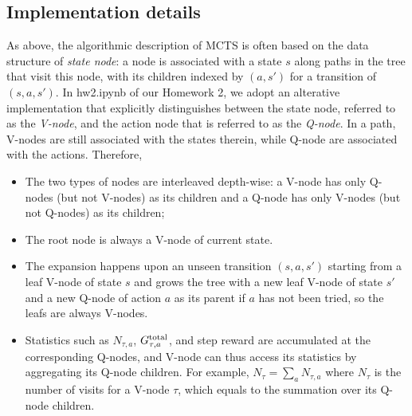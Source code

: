 \subsection*{Implementation details}
As above, the algorithmic description of MCTS is often based on the data structure of {\em state node}: a node is associated with a state $s$ along paths in the tree that visit this node, with its children indexed by $(a,s')$ for a transition of $(s,a,s')$.
In hw2.ipynb of our Homework 2, we adopt an alterative implementation that explicitly distinguishes between the state node, referred to as the {\em V-node}, and the action node that is referred to as the {\em Q-node}.
In a path, V-nodes are still associated with the states therein, while Q-node are associated with the actions.
Therefore, 
\begin{itemize}
    \item The two types of nodes are interleaved depth-wise: a V-node has only Q-nodes (but not V-nodes) as its children and a Q-node has only V-nodes (but not Q-nodes) as its children;
    \item The root node is always a V-node of current state. 
    \item The expansion happens upon an unseen transition $(s,a,s')$ starting from a leaf V-node of state $s$ and grows the tree with a new leaf V-node of state $s'$ and a new Q-node of action $a$ as its parent if $a$ has not been tried, so the leafs are always V-nodes. 
    \item Statistics such as $N_{\tau,a}$, $G^{\rm total}_{\tau,a}$, and step reward are accumulated at the corresponding Q-nodes, and V-node can thus access its statistics by aggregating its Q-node children. For example, $N_\tau=\sum_a N_{\tau,a}$ where $N_\tau$ is the number of visits for a V-node $\tau$, which equals to the summation over its Q-node children.
\end{itemize}


